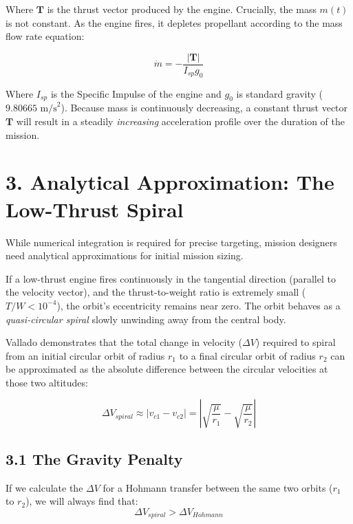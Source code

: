 \documentclass[11pt, a4paper]{article}
\begin{document}
Where $\boldsymbol{T}$ is the thrust vector produced by the engine. Crucially, the mass $m(t)$ is not constant. As the engine fires, it depletes propellant according to the mass flow rate equation:

\begin{equation}
    \dot{m} = -\frac{|\boldsymbol{T}|}{I_{sp} g_0}
\end{equation}

Where $I_{sp}$ is the Specific Impulse of the engine and $g_0$ is standard gravity ($9.80665 \text{ m/s}^2$). Because mass is continuously decreasing, a constant thrust vector $\boldsymbol{T}$ will result in a steadily \textit{increasing} acceleration profile over the duration of the mission.

\section*{3. Analytical Approximation: The Low-Thrust Spiral}
While numerical integration is required for precise targeting, mission designers need analytical approximations for initial mission sizing. 

If a low-thrust engine fires continuously in the tangential direction (parallel to the velocity vector), and the thrust-to-weight ratio is extremely small ($T/W < 10^{-4}$), the orbit's eccentricity remains near zero. The orbit behaves as a \textit{quasi-circular spiral} slowly unwinding away from the central body.

Vallado demonstrates that the total change in velocity ($\Delta V$) required to spiral from an initial circular orbit of radius $r_1$ to a final circular orbit of radius $r_2$ can be approximated as the absolute difference between the circular velocities at those two altitudes:

\begin{equation}
    \Delta V_{spiral} \approx |v_{c1} - v_{c2}| = \left| \sqrt{\frac{\mu}{r_1}} - \sqrt{\frac{\mu}{r_2}} \right|
\end{equation}

\subsection*{3.1 The Gravity Penalty}
If we calculate the $\Delta V$ for a Hohmann transfer between the same two orbits ($r_1$ to $r_2$), we will always find that:
\begin{equation}
    \Delta V_{spiral} > \Delta V_{Hohmann}
\end{equation}
\end{document}
